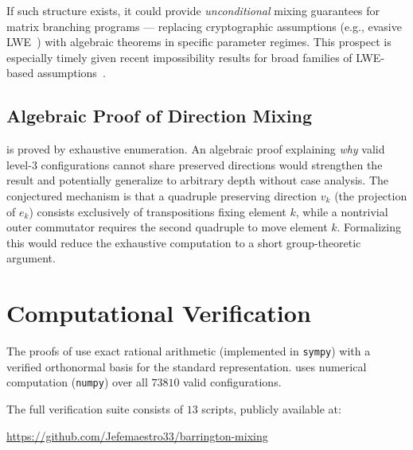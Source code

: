 \documentclass[11pt]{article}
\begin{document}
If such structure exists, it could provide \emph{unconditional} mixing
guarantees for matrix branching programs --- replacing cryptographic
assumptions (e.g., evasive LWE~\cite{WW21}) with algebraic theorems
in specific parameter regimes.  This prospect is especially timely given
recent impossibility results for broad families of LWE-based
assumptions~\cite{DJMMV25}.


\subsection{Algebraic Proof of Direction Mixing}

 is proved by exhaustive enumeration. An algebraic proof
explaining \emph{why} valid level-$3$ configurations cannot share preserved
directions would strengthen the result and potentially generalize to arbitrary
depth without case analysis. The conjectured mechanism is that a quadruple
preserving direction $v_k$ (the projection of $e_k$) consists exclusively of
transpositions fixing element $k$, while a nontrivial outer commutator requires
the second quadruple to move element $k$. Formalizing this would reduce the
exhaustive computation to a short group-theoretic argument.


\section{Computational Verification}
\label{sec:computation}

The proofs of  use exact rational arithmetic
(implemented in \texttt{sympy}) with a verified orthonormal basis for the
standard representation.  uses numerical computation
(\texttt{numpy}) over all $73810$ valid configurations.

The full verification suite consists of $13$ scripts,
publicly available at:
\begin{center}
\url{https://github.com/Jefemaestro33/barrington-mixing}
\end{center}
\end{document}
